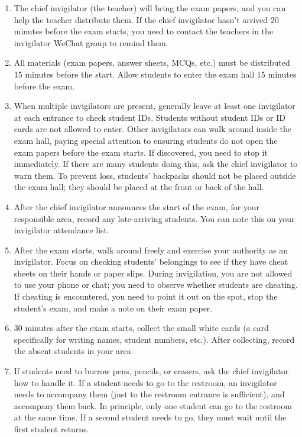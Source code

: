 \begin{enumerate}
    \item The chief invigilator (the teacher) will bring the exam papers, and you can help the teacher distribute them. If the chief invigilator hasn't arrived 20 minutes before the exam starts, you need to contact the teachers in the invigilator WeChat group to remind them.
    \item All materials (exam papers, answer sheets, MCQs, etc.) must be distributed 15 minutes before the start. Allow students to enter the exam hall 15 minutes before the exam.
    \item When multiple invigilators are present, generally leave at least one invigilator at each entrance to check student IDs. Students without student IDs or ID cards are not allowed to enter. Other invigilators can walk around inside the exam hall, paying special attention to ensuring students do not open the exam papers before the exam starts. If discovered, you need to stop it immediately. If there are many students doing this, ask the chief invigilator to warn them. To prevent loss, students' backpacks should not be placed outside the exam hall; they should be placed at the front or back of the hall.
    \item After the chief invigilator announces the start of the exam, for your responsible area, record any late-arriving students. You can note this on your invigilator attendance list.
    \item After the exam starts, walk around freely and exercise your authority as an invigilator. Focus on checking students' belongings to see if they have cheat sheets on their hands or paper slips. During invigilation, you are not allowed to use your phone or chat; you need to observe whether students are cheating. If cheating is encountered, you need to point it out on the spot, stop the student's exam, and make a note on their exam paper.
    \item 30 minutes after the exam starts, collect the small white cards (a card specifically for writing names, student numbers, etc.). After collecting, record the absent students in your area.
    \item If students need to borrow pens, pencils, or erasers, ask the chief invigilator how to handle it. If a student needs to go to the restroom, an invigilator needs to accompany them (just to the restroom entrance is sufficient), and accompany them back. In principle, only one student can go to the restroom at the same time. If a second student needs to go, they must wait until the first student returns.

\end{enumerate}
